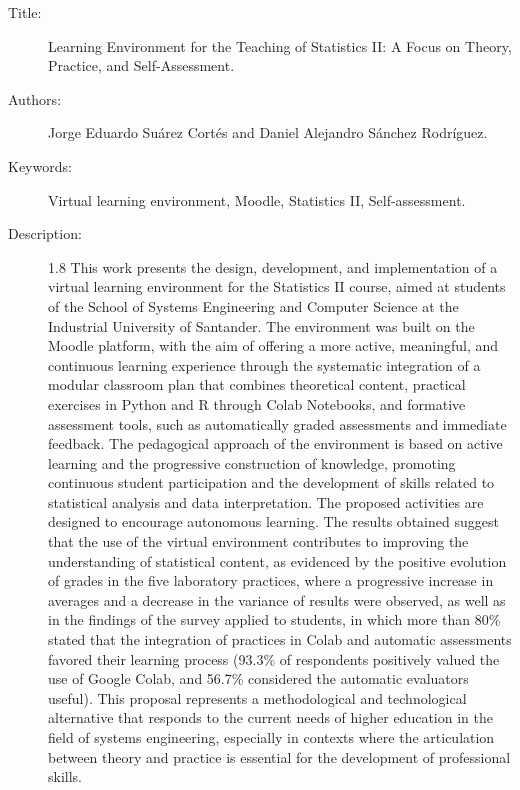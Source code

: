 \documentclass[letter,oneside,12pt,spanish]{report}
\begin{document}
\footnotesize{
\begin{description}
  \item[Title:] Learning Environment for the Teaching of Statistics II: A Focus on Theory, Practice, and Self-Assessment.
  \item[Authors:] Jorge Eduardo Suárez Cortés and Daniel Alejandro Sánchez Rodríguez.
  \item[Keywords:] Virtual learning environment, Moodle, Statistics II, Self-assessment.
  \item[Description:] {
    \begin{spacing}{1.8}
	This work presents the design, development, and implementation of a virtual learning environment for the Statistics II course, aimed at students of the School of Systems Engineering and Computer Science at the Industrial University of Santander. The environment was built on the Moodle platform, with the aim of offering a more active, meaningful, and continuous learning experience through the systematic integration of a modular classroom plan that combines theoretical content, practical exercises in Python and R through Colab Notebooks, and formative assessment tools, such as automatically graded assessments and immediate feedback.  
	The pedagogical approach of the environment is based on active learning and the progressive construction of knowledge, promoting continuous student participation and the development of skills related to statistical analysis and data interpretation. The proposed activities are designed to encourage autonomous learning. The results obtained suggest that the use of the virtual environment contributes to improving the understanding of statistical content, as evidenced by the positive evolution of grades in the five laboratory practices, where a progressive increase in averages and a decrease in the variance of results were observed, as well as in the findings of the survey applied to students, in which more than 80\% stated that the integration of practices in Colab and automatic assessments favored their learning process (93.3\% of respondents positively valued the use of Google Colab, and 56.7\% considered the automatic evaluators useful).  
    This proposal represents a methodological and technological alternative that responds to the current needs of higher education in the field of systems engineering, especially in contexts where the articulation between theory and practice is essential for the development of professional skills.
	\end{spacing}
  }
\end{description}}\normalsize
\end{document}

